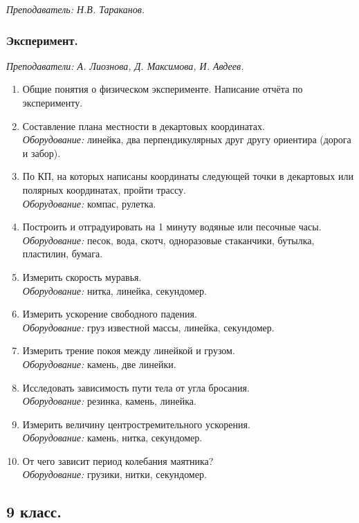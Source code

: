 \documentclass[11pt]{article}
\newlength{\h}
\newlength{\x}
\begin{document}
\textit{Преподаватель: Н.В. Тараканов.}

\subsubsection{Эксперимент.}
\label{sec:exp8}

\textit{Преподаватели: А. Лиознова, Д. Максимова, И. Авдеев.}

\begin{enumerate}
\item Общие понятия о физическом эксперименте. Написание отчёта по
  эксперименту.
\item Составление плана местности в декартовых координатах.\\
  \textit{Оборудование:} линейка, два перпендикулярных друг другу
  ориентира (дорога и забор).
\item По КП, на которых написаны координаты следующей точки в
  декартовых или полярных координатах, пройти трассу.\\
  \textit{Оборудование:} компас, рулетка.
\item Построить и отградуировать на 1 минуту водяные или песочные
  часы. \\
  \textit{Оборудование:} песок, вода, скотч, одноразовые стаканчики,
  бутылка, пластилин, бумага.
\item Измерить скорость муравья.\\
  \textit{Оборудование:} нитка, линейка, секундомер.
\item Измерить ускорение свободного падения. \\
  \textit{Оборудование:} груз известной массы, линейка, секундомер.
\item Измерить трение покоя между линейкой и грузом. \\
  \textit{Оборудование:} камень, две линейки.
\item Исследовать зависимость пути тела от угла бросания. \\
  \textit{Оборудование:} резинка, камень, линейка.
\item Измерить величину центростремительного ускорения.\\
  \textit{Оборудование:} камень, нитка, секундомер.
\item От чего зависит период колебания маятника? \\
  \textit{Оборудование:} грузики, нитки, секундомер.
\end{enumerate}

\subsection{9 класс.}
\label{sec:daily9}
\end{document}
